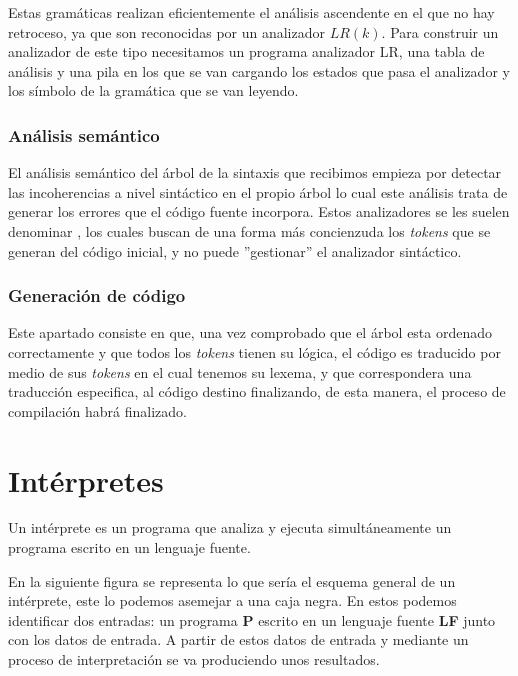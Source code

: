 \documentclass{article}
\begin{document}
    Estas gramáticas realizan eficientemente el análisis ascendente en el que no hay retroceso, ya que son reconocidas por
    un analizador $LR(k)$.
    Para construir un analizador de este tipo necesitamos un programa analizador LR, una tabla de análisis y una pila en
    los que se van cargando los estados que pasa el analizador y los símbolo de la gramática que se van leyendo.

    \subsubsection*{Análisis semántico}

    El análisis semántico del árbol de la sintaxis que recibimos empieza por detectar las incoherencias a nivel sintáctico
    en el propio árbol lo cual este análisis trata de generar los errores que el código fuente incorpora. Estos analizadores
    se les suelen denominar , los cuales buscan de una forma más concienzuda los \textit{tokens} que se generan del código
    inicial, y no puede ''gestionar'' el analizador sintáctico.

    \subsubsection*{Generación de código}
    Este apartado consiste en que, una vez comprobado que el árbol esta ordenado correctamente y que todos los \textit{tokens} tienen
    su lógica, el código es traducido por medio de sus \textit{tokens} en el cual tenemos su lexema, y que correspondera una traducción
    especifica, al código destino finalizando, de esta manera, el proceso de compilación habrá finalizado.


    \section{Intérpretes}
        Un intérprete es un programa que analiza y ejecuta simultáneamente un programa escrito en un lenguaje fuente.

    En la siguiente figura se representa lo que sería el esquema general de un intérprete, este lo podemos asemejar
    a una caja negra. En estos podemos identificar dos entradas: un programa \textbf{P} escrito en un lenguaje fuente \textbf{LF}
    junto con los datos de entrada. A partir de estos datos de entrada y mediante un proceso de interpretación se va produciendo
    unos resultados.
\end{document}
